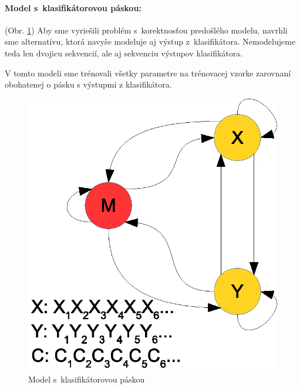 \documentclass[myposter,portrait]{sciposter}
\begin{document}
\begin{multicols*}{3}
\paragraph{Model s~klasifikátorovou páskou:} (Obr. \ref{fig:model-clf-tape})
Aby sme vyriešili problém s~korektnosťou predošlého modelu, navrhli sme alternatívu, ktorá navyše modeluje aj výstup z~klasifikátora.
Nemodelujeme teda len dvojicu sekvencií, ale aj sekvenciu výstupov klasifikátora.

V tomto modeli sme trénovali všetky parametre na trénovacej vzorke zarovnaní obohatenej o pásku s výstupmi z klasifikátora.

\begin{figure}[htp]
        \centering
        \includegraphics[width=.5\textwidth, clip=true]{images/model_clf_paska}
        \caption{Model s~klasifikátorovou páskou}
        \label{fig:model-clf-tape}
\end{figure}





\end{multicols*}
\end{document}
